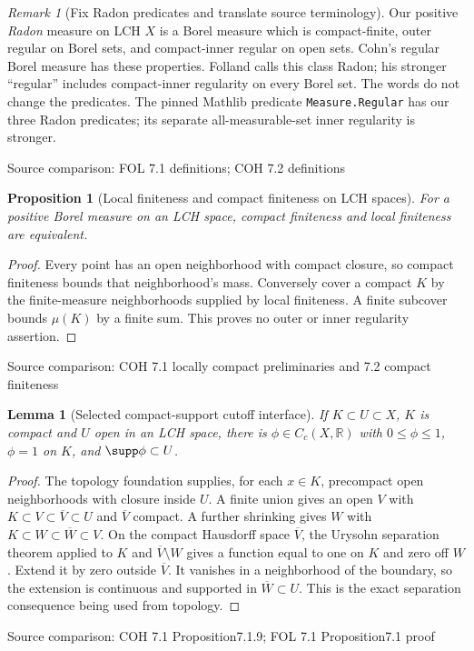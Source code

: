 \documentclass[11pt,oneside,openany]{book}
\newtheorem{lemma}[theorem]{Lemma}
\newtheorem{proposition}[theorem]{Proposition}
\theoremstyle{definition}
\theoremstyle{remark}
\newtheorem{remark}[theorem]{Remark}
\newcounter{foundation}\renewcommand{\thefoundation}{F\arabic{foundation}}
\newcommand{\R}{\mathbb R}\newcommand{\C}{\mathbb C}
\newcommand{\family}[1]{}
\newcommand{\source}[1]{\par\begingroup\small\sffamily\color{black!65}Source comparison: #1\par\endgroup}
\begin{document}
\begin{remark}[Fix Radon predicates and translate source terminology]\family{D11.18.radon_and_source_names}\label{d11:18:radon-and-source-names}
Our positive \emph{Radon} measure on LCH $X$ is a Borel measure which is compact-finite, outer regular on Borel sets, and compact-inner regular on open sets. Cohn's regular Borel measure has these properties. Folland calls this class Radon; his stronger ``regular'' includes compact-inner regularity on every Borel set. The words do not change the predicates. The pinned Mathlib predicate \texttt{Measure.Regular} has our three Radon predicates; its separate all-measurable-set inner regularity is stronger.
\end{remark}
\source{FOL 7.1 definitions; COH 7.2 definitions}

\begin{proposition}[Local finiteness and compact finiteness on LCH spaces]\family{D11.18.lch_local_finite_bridge}\label{d11:18:lch-local-finite-bridge}
For a positive Borel measure on an LCH space, compact finiteness and local finiteness are equivalent.
\end{proposition}
\begin{proof}
Every point has an open neighborhood with compact closure, so compact finiteness bounds that neighborhood's mass. Conversely cover a compact $K$ by the finite-measure neighborhoods supplied by local finiteness. A finite subcover bounds $\mu(K)$ by a finite sum. This proves no outer or inner regularity assertion.
\end{proof}
\source{COH 7.1 locally compact preliminaries and 7.2 compact finiteness}

\begin{lemma}[Selected compact-support cutoff interface]\family{D11.18.compact_cutoff}\label{d11:18:compact-cutoff}
If $K\subset U\subset X$, $K$ is compact and $U$ open in an LCH space, there is $\phi\in C_c(X,\R)$ with $0\le\phi\le1$, $\phi=1$ on $K$, and $\supp\phi\subset U$.
\end{lemma}
\begin{proof}
The topology foundation supplies, for each $x\in K$, precompact open neighborhoods with closure inside $U$. A finite union gives an open $V$ with $K\subset V\subset\overline V\subset U$ and $\overline V$ compact. A further shrinking gives $W$ with $K\subset W\subset\overline W\subset V$. On the compact Hausdorff space $\overline V$, the Urysohn separation theorem applied to $K$ and $\overline V\setminus W$ gives a function equal to one on $K$ and zero off $W$. Extend it by zero outside $\overline V$. It vanishes in a neighborhood of the boundary, so the extension is continuous and supported in $\overline W\subset U$. This is the exact separation consequence being used from topology.
\end{proof}
\source{COH 7.1 Proposition7.1.9; FOL 7.1 Proposition7.1 proof}
\end{document}
